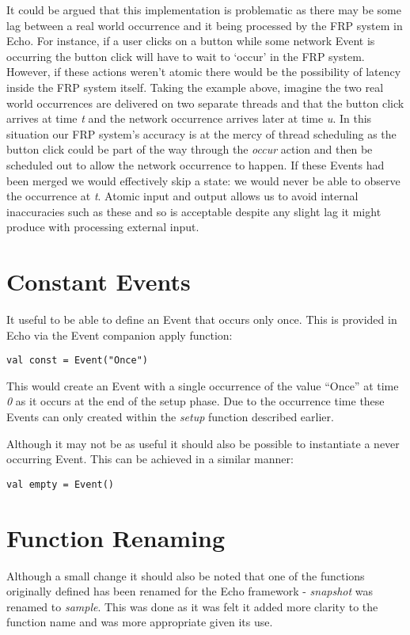      It could be argued that this implementation is problematic as there may be some lag between a real world
     occurrence and it being processed by the FRP system in Echo. For instance, if a user clicks on a button
     while some network Event is occurring the button click will have to wait to `occur' in the FRP system.
     However, if these actions weren't atomic there would be the possibility of latency inside the FRP
     system itself. Taking the example above, imagine the two real world occurrences are delivered on two
     separate threads and that the button click arrives at time \emph{t} and the network occurrence
     arrives later at time \emph{u}. In this
     situation our FRP system's accuracy is at the mercy of thread scheduling as the button click
     could be part of the way through the \emph{occur} action and then be scheduled out to allow the network
     occurrence to happen. If these Events had been merged we would effectively skip a state:
     we would never be able to observe the occurrence at \emph{t}. Atomic input and output allows us
     to avoid internal inaccuracies such as these and so is acceptable despite any slight lag it might
     produce with processing external input.
  
  \section{Constant Events}
    It useful to be able to define an Event that occurs only once. This is provided in Echo
    via the Event companion apply function:

\begin{verbatim}
val const = Event("Once")
\end{verbatim}    

    This would create an Event with a single occurrence of the value ``Once'' at time \emph{0} as
    it occurs at the end of the setup phase. Due to the occurrence time these Events can only created
    within the \emph{setup} function described earlier.
    
    Although it may not be as useful it should also be possible to instantiate a never occurring
    Event. This can be achieved in a similar manner:

\begin{verbatim}
val empty = Event()
\end{verbatim}
     
  \section{Function Renaming}
    Although a small change it should also be noted that one of the functions originally defined
    has been renamed for the Echo framework - \emph{snapshot} was renamed to \emph{sample}. This was done as
    it was felt it added more clarity to the function name and was more appropriate given its use.
    
